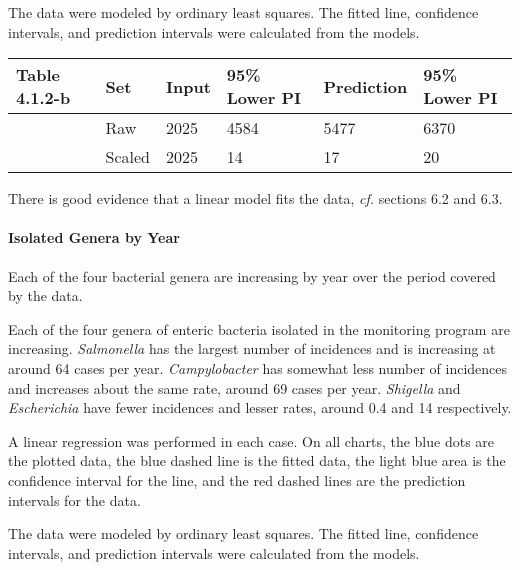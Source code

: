 \documentclass[11pt]{article}
\begin{document}
The data were modeled by ordinary least squares. The fitted line,
confidence intervals, and prediction intervals were calculated from the
models.

\begin{longtable}[]{@{}llllll@{}}
\toprule
Table 4.1.2-b & Set & Input & 95\% Lower PI & Prediction & 95\% Lower
PI\tabularnewline
\midrule
\endhead
& Raw & 2025 & 4584 & 5477 & 6370\tabularnewline
& Scaled & 2025 & 14 & 17 & 20\tabularnewline
\bottomrule
\end{longtable}

There is good evidence that a linear model fits the data, \emph{cf.}
sections 6.2 and 6.3.

    \hypertarget{isolated-genera-by-year}{%
\paragraph{Isolated Genera by Year}\label{isolated-genera-by-year}}

    Each of the four bacterial genera are increasing by year over the period
covered by the data.

Each of the four genera of enteric bacteria isolated in the monitoring
program are increasing. \emph{Salmonella} has the largest number of
incidences and is increasing at around 64 cases per year.
\emph{Campylobacter} has somewhat less number of incidences and
increases about the same rate, around 69 cases per year. \emph{Shigella}
and \emph{Escherichia} have fewer incidences and lesser rates, around
0.4 and 14 respectively.

A linear regression was performed in each case. On all charts, the blue
dots are the plotted data, the blue dashed line is the fitted data, the
light blue area is the confidence interval for the line, and the red
dashed lines are the prediction intervals for the data.

The data were modeled by ordinary least squares. The fitted line,
confidence intervals, and prediction intervals were calculated from the
models.
\end{document}
